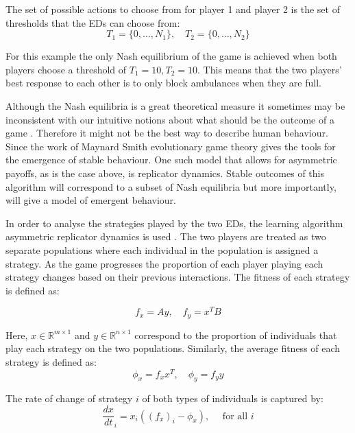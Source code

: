 The set of possible actions to choose from for player 1 and player 2 is the
set of thresholds that the EDs can choose from: 
\begin{equation}
    T_1 = \{ 0, \ldots, N_1 \}, \quad T_2 = \{ 0, \ldots, N_2 \}
\end{equation}

For this example the only Nash equilibrium of the game is achieved when both 
players choose a threshold of \( T_1 = 10, T_2 = 10 \).
This means that the two players' best response to each other is to only block
ambulances when they are full. 

Although the Nash equilibria is a great theoretical measure it sometimes may be
inconsistent with our intuitive notions about what should be the outcome of a 
game \cite{myerson1978refinements}.
Therefore it might not be the best way to describe human behaviour.
Since the work of Maynard Smith \cite{smith1986evolutionary} evolutionary game 
theory gives the tools for the emergence of stable behaviour.
One such model that allows for asymmetric payoffs, as is the case above, is 
replicator dynamics.
Stable outcomes of this algorithm will correspond to a subset of Nash
equilibria but more importantly, will give a model of emergent behaviour. 

In order to analyse the strategies played by the two EDs, the learning algorithm
asymmetric replicator dynamics is used \cite{asymmetricreplicatordynamics}.
The two players are treated as two separate populations where each 
individual in the population is assigned a strategy. 
As the game progresses the proportion of each player playing each strategy 
changes based on their previous interactions.
The fitness of each strategy is defined as:

\begin{equation}\label{eq:asymmetric_fitness}
    f_x = Ay, \quad f_y = x^T B
\end{equation}

Here, \(x \in \mathbb{R}^{m \times 1} \) and
\(y \in \mathbb{R}^{n \times 1}\) correspond to the proportion of individuals 
that play each strategy on the two populations.
Similarly, the average fitness of each strategy is defined as:
\begin{equation}
    \phi_x = f_x x^T, \quad \phi_y = f_y y
\end{equation}

The rate of change of strategy \( i \) of both types of individuals is captured 
by:
\begin{equation}
    \frac{dx}{dt}_i = x_i((f_x)_i - \phi_x), \quad \text{ for all }i
\end{equation}

